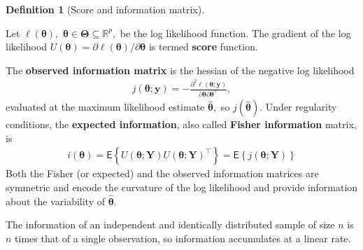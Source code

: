 \documentclass[
  11pt,
  letterpaper,
]{scrbook}
\theoremstyle{definition}
\theoremstyle{plain}
\theoremstyle{plain}
\theoremstyle{plain}
\theoremstyle{definition}
\theoremstyle{definition}
\newtheorem{definition}{Definition}[chapter]
\theoremstyle{plain}
\theoremstyle{plain}
\theoremstyle{remark}
\begin{document}
\begin{definition}[Score and information
matrix]\protect\hypertarget{def-information}{}\label{def-information}

Let \(\ell(\boldsymbol{\theta}),\)
\(\boldsymbol{\theta} \in \boldsymbol{\Theta} \subseteq \mathbb{R}^p,\)
be the log likelihood function. The gradient of the log likelihood
\(U(\boldsymbol{\theta}) = \partial \ell(\boldsymbol{\theta}) / \partial \boldsymbol{\theta}\)
is termed \textbf{score} function.

The \textbf{observed information matrix} is the hessian of the negative
log likelihood \begin{align*}
j(\boldsymbol{\theta}; \boldsymbol{y})=-\frac{\partial^2 \ell(\boldsymbol{\theta}; \boldsymbol{y})}{\partial \boldsymbol{\theta} \partial \boldsymbol{\theta}^\top},
\end{align*} evaluated at the maximum likelihood estimate
\(\widehat{\boldsymbol{\theta}},\) so
\(j(\widehat{\boldsymbol{\theta}}).\) Under regularity conditions, the
\textbf{expected information}, also called \textbf{Fisher information}
matrix, is \begin{align*}
i(\boldsymbol{\theta}) = \mathsf{E}\left\{U(\boldsymbol{\theta}; \boldsymbol{Y}) U(\boldsymbol{\theta}; \boldsymbol{Y})^\top\right\} = \mathsf{E}\left\{j(\boldsymbol{\theta}; \boldsymbol{Y})\right\}
\end{align*} Both the Fisher (or expected) and the observed information
matrices are symmetric and encode the curvature of the log likelihood
and provide information about the variability of
\(\widehat{\boldsymbol{\theta}}.\)

The information of an independent and identically distributed sample of
size \(n\) is \(n\) times that of a single observation, so information
accumulates at a linear rate.

\end{definition}
\end{document}
